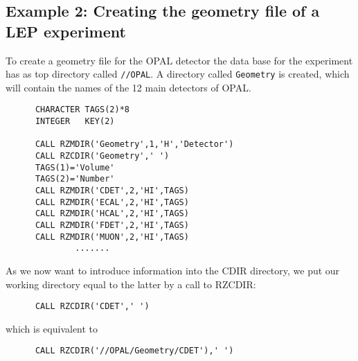 \subsection{Example 2: Creating the geometry file of a LEP experiment}
\par To create a geometry file for the OPAL detector
the data base for the experiment has as top directory called
{\tt //OPAL}.
A directory called {\tt Geometry} is created, which will contain
the names of the 12 main detectors of OPAL.
\begin{verbatim}
      CHARACTER TAGS(2)*8
      INTEGER   KEY(2)
 
      CALL RZMDIR('Geometry',1,'H','Detector')
      CALL RZCDIR('Geometry',' ')
      TAGS(1)='Volume'
      TAGS(2)='Number'
      CALL RZMDIR('CDET',2,'HI',TAGS)
      CALL RZMDIR('ECAL',2,'HI',TAGS)
      CALL RZMDIR('HCAL',2,'HI',TAGS)
      CALL RZMDIR('FDET',2,'HI',TAGS)
      CALL RZMDIR('MUON',2,'HI',TAGS)
              .......
\end{verbatim}
As we now want to introduce information into the CDIR directory,
we put our working directory equal to the latter by a call to RZCDIR:
\begin{verbatim}
      CALL RZCDIR('CDET',' ')
\end{verbatim}
which is equivalent to
\begin{verbatim}
      CALL RZCDIR('//OPAL/Geometry/CDET'),' ')
\end{verbatim}
